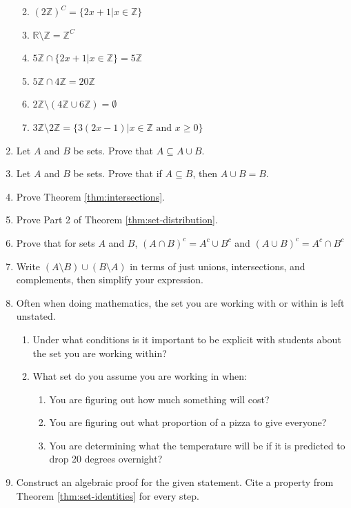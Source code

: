 \documentclass[
]{book}
\providecommand{\tightlist}{%
  \setlength{\itemsep}{0pt}\setlength{\parskip}{0pt}}
\theoremstyle{definition}
\theoremstyle{definition}
\theoremstyle{definition}
\theoremstyle{remark}
\begin{document}
\begin{enumerate}
  \begin{enumerate}
  \def\labelenumii{\alph{enumii}.}
  \tightlist
  \item
    \((2\mathbb{Z})^C = \{2x+1 \vert x \in \mathbb{Z}\}\)
  \item
    \(\mathbb{R}\setminus \mathbb{Z}=\mathbb{Z}^C\)
  \item
    \(5\mathbb{Z} \cap \{2x+1 \vert x \in \mathbb{Z}\} = 5\mathbb{Z}\)
  \item
    \(5\mathbb{Z} \cap 4\mathbb{Z} = 20\mathbb{Z}\)
  \item
    \(2\mathbb{Z}\setminus (4\mathbb{Z} \cup 6\mathbb{Z})= \emptyset\)
  \item
    \(3\mathbb{Z}\setminus 2\mathbb{Z}=\{3(2x-1) \vert x\in \mathbb{Z} \textrm{ and } x\geq 0\}\)
  \end{enumerate}
\item
  Let \(A\) and \(B\) be sets. Prove that \(A\subseteq A\cup B\).
\item
  Let \(A\) and \(B\) be sets. Prove that if \(A\subseteq B\), then \(A\cup B=B\).
\item
  Prove Theorem \ref{thm:intersections}.
\item
  Prove Part 2 of Theorem \ref{thm:set-distribution}.
\item
  Prove that for sets \(A\) and \(B\), \((A\cap B)^c = A^c \cup B^c\) and \((A\cup B)^c=A^c\cap B^c\)
\item
  Write \((A\setminus B)\cup (B\setminus A)\) in terms of just unions, intersections, and complements, then simplify your expression.
\item
  Often when doing mathematics, the set you are working with or within is left unstated.

  \begin{enumerate}
  \def\labelenumii{\alph{enumii}.}
  \tightlist
  \item
    Under what conditions is it important to be explicit with students about the set you are working within?
  \item
    What set do you assume you are working in when:

    \begin{enumerate}
    \def\labelenumiii{\arabic{enumiii}.}
    \tightlist
    \item
      You are figuring out how much something will cost?
    \item
      You are figuring out what proportion of a pizza to give everyone?
    \item
      You are determining what the temperature will be if it is predicted to drop 20 degrees overnight?
    \end{enumerate}
  \end{enumerate}
\item
  Construct an algebraic proof for the given statement. Cite a property from Theorem \ref{thm:set-identities} for every step.
\end{enumerate}
\end{document}
